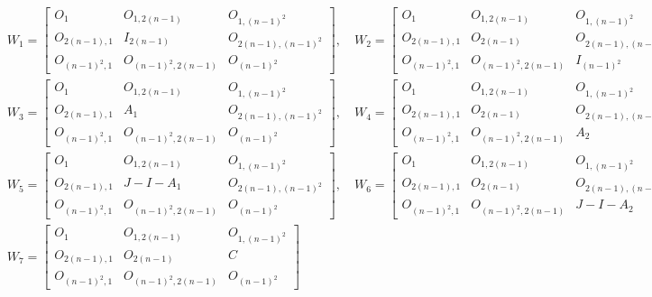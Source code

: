 \begin{align*}
    &W_1 = \begin{bmatrix}
        O_1 & O_{1,2(n-1)} & O_{1,(n-1)^2}\\
        O_{2(n-1),1} & I_{2(n-1)} & O_{2(n-1), (n-1)^2} \\
        O_{(n-1)^2,1} & O_{(n-1)^2, 2(n-1)} & O_{(n-1)^2}
    \end{bmatrix}, \quad
    W_2 = \begin{bmatrix}
    O_1 & O_{1,2(n-1)} & O_{1,(n-1)^2}\\
    O_{2(n-1),1} &    O_{2(n-1)} & O_{2(n-1), (n-1)^2} \\
    O_{(n-1)^2,1} &    O_{(n-1)^2, 2(n-1)} & I_{(n-1)^2}
    \end{bmatrix}\\
    &W_3 = \begin{bmatrix}
    O_1 & O_{1,2(n-1)} & O_{1,(n-1)^2}\\
    O_{2(n-1),1} &    A_1 & O_{2(n-1), (n-1)^2} \\
    O_{(n-1)^2,1} &    O_{(n-1)^2, 2(n-1)} & O_{(n-1)^2}
    \end{bmatrix}, \quad
    W_4 = \begin{bmatrix}
    O_1 & O_{1,2(n-1)} & O_{1,(n-1)^2}\\
    O_{2(n-1),1} &    O_{2(n-1)} & O_{2(n-1), (n-1)^2} \\
    O_{(n-1)^2,1} &    O_{(n-1)^2, 2(n-1)} & A_2
    \end{bmatrix}\\
    &W_5 = \begin{bmatrix}
    O_1 & O_{1,2(n-1)} & O_{1,(n-1)^2}\\
    O_{2(n-1),1} &    J-I-A_1 & O_{2(n-1), (n-1)^2} \\
    O_{(n-1)^2,1} &    O_{(n-1)^2, 2(n-1)} & O_{(n-1)^2}
    \end{bmatrix}, \quad
    W_6 = \begin{bmatrix}
    O_1 & O_{1,2(n-1)} & O_{1,(n-1)^2}\\
    O_{2(n-1),1} &    O_{2(n-1)} & O_{2(n-1), (n-1)^2} \\
    O_{(n-1)^2,1} &    O_{(n-1)^2, 2(n-1)} & J-I-A_2
    \end{bmatrix}\\
    &W_7 = \begin{bmatrix}
    O_1 & O_{1,2(n-1)} & O_{1,(n-1)^2}\\
    O_{2(n-1),1} &    O_{2(n-1)} & C\\
    O_{(n-1)^2,1} &    O_{(n-1)^2, 2(n-1)} & O_{(n-1)^2}

\end{bmatrix}
\end{align*}
